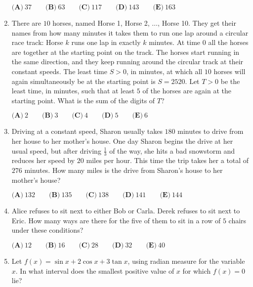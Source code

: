 \documentclass{article}
\begin{document}
\begin{enumerate}[label=\arabic*., itemsep=0.5em]
\(\textbf{(A)}\ 37\qquad\textbf{(B)}\ 63\qquad\textbf{(C)}\ 117\qquad\textbf{(D)}\ 143\qquad\textbf{(E)}\ 163\)\par \vspace{0.5em}\item There are \(10\) horses, named Horse 1, Horse 2, \(\ldots\), Horse 10. They get their names from how many minutes it takes them to run one lap around a circular race track: Horse \(k\) runs one lap in exactly \(k\) minutes. At time 0 all the horses are together at the starting point on the track. The horses start running in the same direction, and they keep running around the circular track at their constant speeds. The least time \(S > 0\), in minutes, at which all \(10\) horses will again simultaneously be at the starting point is \(S = 2520\). Let  \(T>0\) be the least time, in minutes, such that at least \(5\) of the horses are again at the starting point. What is the sum of the digits of  \(T\)?

\(\textbf{(A)}\ 2\qquad\textbf{(B)}\ 3\qquad\textbf{(C)}\ 4\qquad\textbf{(D)}\ 5\qquad\textbf{(E)}\ 6\)\par \vspace{0.5em}\item Driving at a constant speed, Sharon usually takes \(180\) minutes to drive from her house to her mother's house. One day Sharon begins the drive at her usual speed, but after driving \(\frac{1}{3}\) of the way, she hits a bad snowstorm and reduces her speed by \(20\) miles per hour. This time the trip takes her a total of \(276\) minutes. How many miles is the drive from Sharon's house to her mother's house?

\(\textbf{(A)}\ 132 \qquad\textbf{(B)}\ 135 \qquad\textbf{(C)}\ 138 \qquad\textbf{(D)}\ 141 \qquad\textbf{(E)}\ 144\)\par \vspace{0.5em}\item Alice refuses to sit next to either Bob or Carla. Derek refuses to sit next to Eric. How many ways are there for the five of them to sit in a row of \(5\) chairs under these conditions?

\(\textbf{(A)}\ 12  \qquad \textbf{(B)}\ 16 \qquad\textbf{(C)}\ 28 \qquad\textbf{(D)}\ 32 \qquad\textbf{(E)}\ 40\)\par \vspace{0.5em}\item Let \(f(x) = \sin{x} + 2\cos{x} + 3\tan{x}\), using radian measure for the variable \(x\). In what interval does the smallest positive value of \(x\) for which \(f(x) = 0\) lie?


\end{enumerate}
\end{document}
